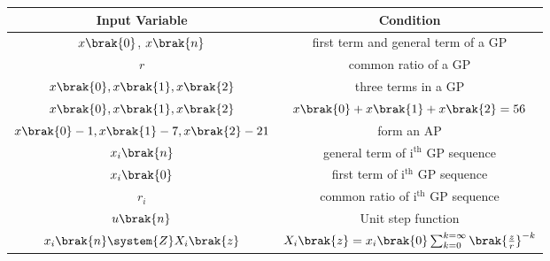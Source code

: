 \begin{tabular}{|c|c|}
        \hline
         Input Variable & Condition\\
        \hline
         $x\brak{0}$, $x\brak{n}$ & first term and general term of a GP\\
         \hline
         $r$ & common ratio of a GP\\
         \hline
         $x\brak{0},x\brak{1},x\brak{2}$ & three terms in a GP \\
         \hline
         $x\brak{0},x\brak{1},x\brak{2}$ & $x\brak{0}+x\brak{1}+x\brak{2}=56$ \\
         \hline
          $x\brak{0}-1,x\brak{1}-7,x\brak{2}-21$ & form an AP \\
         \hline
           $x_i\brak{n}$ & general term of $\text{i}^{\text{th}}$ GP sequence\\
         \hline
           $x_i\brak{0}$ & first term of $\text{i}^{\text{th}}$ GP sequence\\
         \hline
           $r_i$ & common ratio of $\text{i}^{\text{th}}$ GP sequence\\
         \hline
          $u\brak{n}$ & Unit step function  \\
         \hline
         $x_i\brak{n}\system{Z}X_i\brak{z}$ & $X_i\brak{z}=x_i\brak{0}\sum_{k=0}^{k=\infty}\brak{\frac{z}{r}}^{-k}$\\
         \hline
    \end{tabular}
